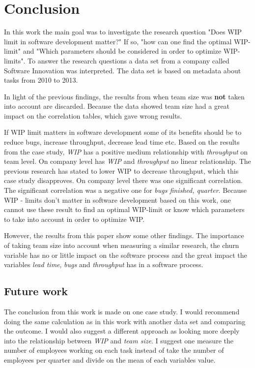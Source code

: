 \documentclass[UKenglish]{ifimaster}  %
\begin{document}
\chapter{Conclusion}
\label{ch:conc}
In this work the main goal was to investigate the research question "Does WIP limit in software development matter?" If so, "how can one find the optimal WIP-limit" and "Which parameters should be considered in order to optimize WIP-limits".  To answer the research questions a data set from a company called Software Innovation was interpreted. The data set is based on metadata about tasks from 2010 to 2013.

In light of the previous findings, the results from when team size was \textbf{not} taken into account are discarded. Because the data showed team size had a great impact on the correlation tables, which gave wrong results.


If WIP limit matters in software development some of its benefits should be to reduce bugs, increase throughput, decrease lead time etc. Based on the results from the case study, \textit{WIP} has a positive medium relationship with \textit{throughput} on team level. On company level has \textit{WIP} and \textit{throughput} no linear relationship. The previous research has stated to lower WIP to decrease throughput, which this case study disapproves. On company level there was one significant correlation. The significant correlation was a negative one for \textit{bugs finished, quarter}. Because WIP - limits don't matter in software development based on this work, one cannot use these result to find an optimal WIP-limit or know which parameters to take into account in order to optimize WIP.

However, the results from this paper show some other findings. The importance of taking team size into account when measuring a similar research, the churn variable has no or little impact on the software process and the great impact the variables \textit{lead time}, \textit{bugs} and \textit{throughput} has in a software process. 

\section{Future work}
The conclusion from this work is made on one case study. I would recommend doing the same calculation as in this work with another data set and comparing the outcome. I would also suggest a different approach as looking more deeply into the relationship between \textit{WIP} and  \textit{team size}. I suggest one measure the number of employees working on each task instead of take the number of employees per quarter and divide on the mean of each variables value.
\end{document}
